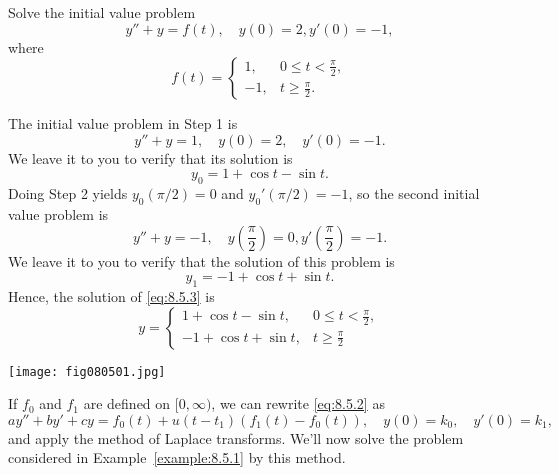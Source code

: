 \documentclass{ximera}
\begin{document}
\begin{example}\label{example:8.5.1}
Solve the initial value problem
\begin{equation}\label{eq:8.5.3}
y''+y=f(t),
\quad   y(0)=2,  y'(0)=-1,
\end{equation}
where
$$
f(t)=\left\{\begin{array}{rl}
1,&0\leq t<\frac{\pi}{2},\\
-1,&t\geq \frac{\pi}{2}.
\end{array}\right.
$$
\begin{explanation}
The initial value problem in Step 1 is
$$
y''+y=1, \quad   y(0)=2,\quad y'(0)=-1.
$$
We leave it to you to verify that its solution is
$$
y_0=1+\cos t-\sin t.
$$
Doing Step 2 yields
 $y_0(\pi/2)=0$ and $y_0'(\pi/2)=-1$,
so the second initial value problem is
$$
y''+y=-1, \quad  y\left(\frac{\pi}{2}\right)=0, y'\left(\frac{\pi}{2}\right)=-1.
$$
We leave it to you to verify that the solution of this problem
is
$$
y_1=-1+\cos t+\sin t.
$$
Hence, the solution of \eqref{eq:8.5.3} is
\begin{equation}\label{eq:8.5.4}
y=\left\{\begin{array}{rl}
1+\cos t-\sin t,&0\leq t<\frac{\pi}{2},
\\
-1+\cos t+\sin t,&t\geq \frac{\pi}{2}
\end{array}\right.
\end{equation}
\begin{image}
 \texttt{[image: fig080501.jpg]}
\end{image}

\end{explanation}
\end{example}

If $f_0$ and $f_1$ are defined on $[0,\infty)$, we can rewrite
\eqref{eq:8.5.2} as
$$
ay''+by'+cy=f_0(t)+u(t-t_1)\left(f_1(t)-f_0(t)\right), \quad  y(0)=k_0,\quad y'(0)=k_1,
$$
and apply the method of Laplace transforms. We'll now solve
the problem considered in Example~\ref{example:8.5.1} by this method.
\end{document}
